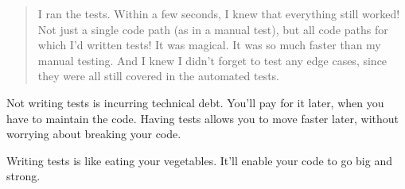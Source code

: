 \documentclass[11pt]{article}
\begin{document}
\begin{quote}
I ran the tests. Within a few seconds, I knew that everything still worked! Not just a single code path (as in a manual test), but all code paths for which I’d written tests! It was magical. It was so much faster than my manual testing. And I knew I didn’t forget to test any edge cases, since they were all still covered in the automated tests.
\end{quote}

Not writing tests is incurring technical debt. You'll pay for it
later, when you have to maintain the code. Having tests
allows you to move faster later, without worrying about breaking your
code.

Writing tests is like eating your vegetables. It'll enable your code to go big and strong.
\end{document}
